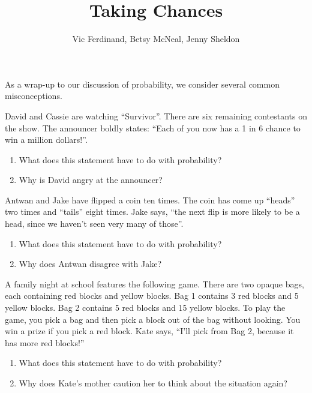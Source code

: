 \documentclass{ximera}
\title{Taking Chances}
\author{Vic Ferdinand, Betsy McNeal, Jenny Sheldon}
\begin{document}
\begin{abstract}
\end{abstract}
\maketitle

\begin{instructorIntro}
As a wrap-up to our discussion of probability, we consider several common misconceptions.


\end{instructorIntro}

\begin{problem}
David and Cassie are watching ``Survivor''.  There are six remaining contestants on the show.  The announcer boldly states: ``Each of you now has a 1 in 6 chance to win a million dollars!''.

\begin{enumerate}
\item What does this statement have to do with probability?
\item Why is David angry at the announcer?
\end{enumerate}
\end{problem}

\begin{problem}
Antwan and Jake have flipped a coin ten times.  The coin has come up ``heads'' two times and ``tails'' eight times.  Jake says, ``the next flip is more likely to be a head, since we haven't seen very many of those''.
\begin{enumerate}
\item What does this statement have to do with probability?
\item Why does Antwan disagree with Jake?
\end{enumerate}
\end{problem}

\begin{problem}
A family night at school features the following game.  There are two opaque bags, each containing red blocks and yellow blocks.  Bag 1 contains 3 red blocks and 5 yellow blocks.  Bag 2 contains 5 red blocks and 15 yellow blocks.  To play the game, you pick a bag and then pick a block out of the bag without looking.  You win a prize if you pick a red block.  Kate says, ``I'll pick from Bag 2, because it has more red blocks!''
\begin{enumerate}
\item What does this statement have to do with probability?
\item Why does Kate's mother caution her to think about the situation again?
\end{enumerate}
\end{problem}
\end{document}
